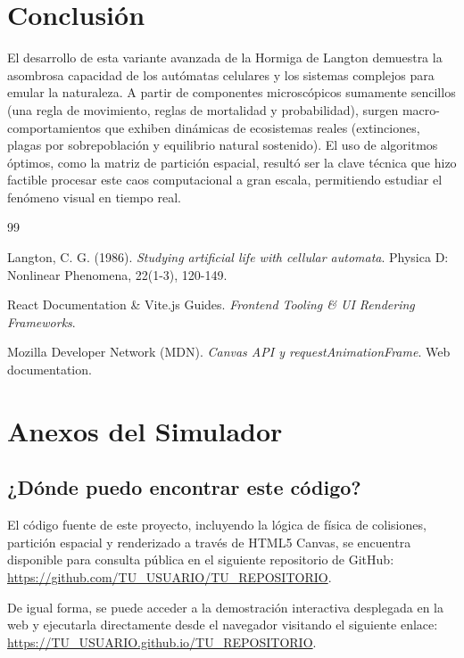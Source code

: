 \documentclass[12pt,a4paper]{article}
\begin{document}
\section{Conclusión}
El desarrollo de esta variante avanzada de la Hormiga de Langton demuestra la asombrosa capacidad de los autómatas celulares y los sistemas complejos para emular la naturaleza. A partir de componentes microscópicos sumamente sencillos (una regla de movimiento, reglas de mortalidad y probabilidad), surgen macro-comportamientos que exhiben dinámicas de ecosistemas reales (extinciones, plagas por sobrepoblación y equilibrio natural sostenido). 
El uso de algoritmos óptimos, como la matriz de partición espacial, resultó ser la clave técnica que hizo factible procesar este caos computacional a gran escala, permitiendo estudiar el fenómeno visual en tiempo real.

\newpage

\begin{thebibliography}{99}

Langton, C. G. (1986). \textit{Studying artificial life with cellular automata}. Physica D: Nonlinear Phenomena, 22(1-3), 120-149.

React Documentation \& Vite.js Guides. \textit{Frontend Tooling \& UI Rendering Frameworks}.

Mozilla Developer Network (MDN). \textit{Canvas API y requestAnimationFrame}. Web documentation.

\end{thebibliography}

\newpage

\appendix
\justifying


\section{Anexos del Simulador}

\subsection{¿Dónde puedo encontrar este código?}
El código fuente de este proyecto, incluyendo la lógica de física de colisiones, partición espacial y renderizado a través de HTML5 Canvas, se encuentra disponible para consulta pública en el siguiente repositorio de GitHub: \url{https://github.com/TU_USUARIO/TU_REPOSITORIO}.

De igual forma, se puede acceder a la demostración interactiva desplegada en la web y ejecutarla directamente desde el navegador visitando el siguiente enlace: \url{https://TU_USUARIO.github.io/TU_REPOSITORIO}.
\end{document}
